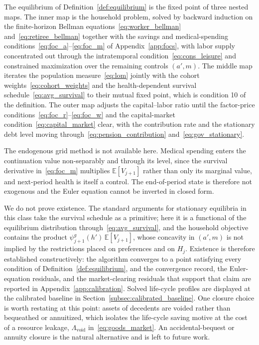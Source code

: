 \documentclass[12pt,a4paper]{article}
\newcommand{\E}{\mathbb{E}}
\begin{document}
The equilibrium of Definition~\ref{def:equilibrium} is the fixed point of three nested maps. The inner map is the household problem, solved by backward induction on the finite-horizon Bellman equations~\eqref{eq:worker_bellman} and~\eqref{eq:retiree_bellman} together with the savings and medical-spending conditions~\eqref{eq:foc_a}--\eqref{eq:foc_m} of Appendix~\ref{app:focs}, with labor supply concentrated out through the intratemporal condition~\eqref{eq:cons_leisure} and constrained maximization over the remaining controls $(a', m)$. The middle map iterates the population measure~\eqref{eq:lom} jointly with the cohort weights~\eqref{eq:cohort_weights} and the health-dependent survival schedule~\eqref{eq:avg_survival} to their mutual fixed point, which is condition 10 of the definition. The outer map adjusts the capital--labor ratio until the factor-price conditions~\eqref{eq:foc_r}--\eqref{eq:foc_w} and the capital-market condition~\eqref{eq:capital_market} clear, with the contribution rate and the stationary debt level moving through~\eqref{eq:pension_contribution} and~\eqref{eq:gov_stationary}.

The endogenous grid method is not available here. Medical spending enters the continuation value non-separably and through its level, since the survival derivative in~\eqref{eq:foc_m} multiplies $\E[V_{j+1}]$ rather than only its marginal value, and next-period health is itself a control. The end-of-period state is therefore not exogenous and the Euler equation cannot be inverted in closed form.

We do not prove existence. The standard arguments for stationary equilibria in this class take the survival schedule as a primitive; here it is a functional of the equilibrium distribution through~\eqref{eq:avg_survival}, and the household objective contains the product $\psi^g_{j+1}(h')\,\E[V_{j+1}]$, whose concavity in $(a',m)$ is not implied by the restrictions placed on preferences and on $H_j$. Existence is therefore established constructively: the algorithm converges to a point satisfying every condition of Definition~\ref{def:equilibrium}, and the convergence record, the Euler-equation residuals, and the market-clearing residuals that support that claim are reported in Appendix~\ref{app:calibration}. Solved life-cycle profiles are displayed at the calibrated baseline in Section~\ref{subsec:calibrated_baseline}. One closure choice is worth restating at this point: assets of decedents are voided rather than bequeathed or annuitized, which isolates the life-cycle saving motive at the cost of a resource leakage, $\Lambda_{\mathrm{void}}$ in~\eqref{eq:goods_market}. An accidental-bequest or annuity closure is the natural alternative and is left to future work.
\end{document}
